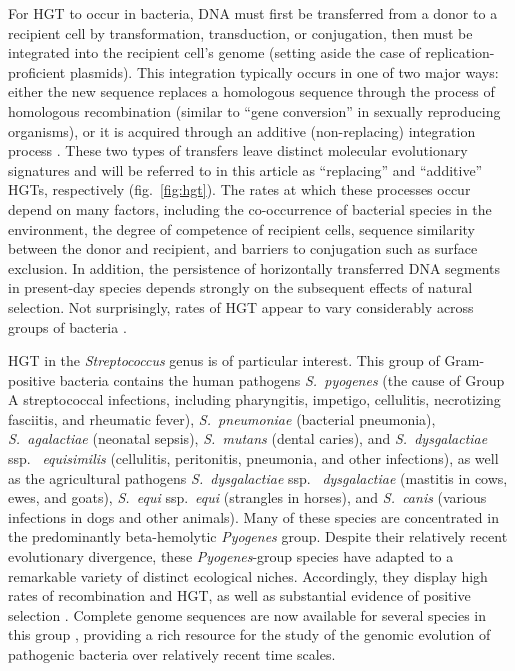 \documentclass[12pt]{article}
\begin{document}
For HGT to occur in bacteria, DNA must first be transferred from a donor to
a recipient cell by transformation, transduction, or conjugation, then must
be integrated into the recipient cell's genome (setting aside the case of
replication-proficient plasmids).  This integration typically occurs in one
of two major ways: either the new sequence replaces a homologous sequence
through the process of homologous recombination (similar to ``gene
conversion'' in sexually reproducing organisms), or it is acquired through
an additive (non-replacing) integration process \citep{Thomas2005}.  These
two types of transfers leave distinct molecular evolutionary signatures and
will be referred to in this article as ``replacing'' and ``additive'' HGTs,
respectively (fig.\ \ref{fig:hgt}).  The rates at which these processes
occur depend on many factors, including the co-occurrence of bacterial
species in the environment,
the degree of competence of recipient cells, sequence similarity between
the donor and recipient, and barriers to conjugation such as surface
exclusion.  In addition, the persistence of horizontally transferred DNA
segments in present-day species depends strongly on the subsequent effects
of natural selection.  Not surprisingly, rates of HGT appear to vary
considerably across groups of bacteria \citep[e.g.,][]{Feil2001}.

HGT in the {\em Streptococcus} genus is of particular interest.  This group
of Gram-positive bacteria contains the human pathogens {\em S.\ pyogenes}
(the cause of Group A streptococcal infections, including pharyngitis,
impetigo, cellulitis, necrotizing fasciitis, and rheumatic fever), {\em S.\
  pneumoniae} (bacterial pneumonia), {\em S.\ agalactiae} (neonatal sepsis),
{\em S.\ mutans} (dental caries), and {\em S.\ dysgalactiae} ssp.\ {\em
  equisimilis} (cellulitis, peritonitis, pneumonia, and other infections),
as well as the agricultural pathogens {\em S.\ dysgalactiae} ssp.\ {\em
  dysgalactiae} (mastitis in cows, ewes, and goats), {\em S.\ equi} ssp.\
{\em equi} (strangles in horses), and {\em S.\ canis} (various infections
in dogs and other animals).  Many of these species are concentrated in the
predominantly beta-hemolytic {\em Pyogenes} group.  Despite their
relatively recent evolutionary divergence, these {\em Pyogenes}-group
species have adapted to a remarkable variety of distinct ecological niches.
Accordingly, they display high rates of recombination and HGT, as well as
substantial evidence of positive selection
\citep{Feil2001,Marri2006,Anisimova2007,Lefebure2007,Suzuki2011}.  Complete
genome sequences are now available for several species in this group
\citep[e.g.,][]{Ferretti2001,Holden2009,Shimomura2011,Suzuki2011},
providing a rich resource for the study of the genomic evolution of
pathogenic bacteria over relatively recent time scales.
\end{document}
